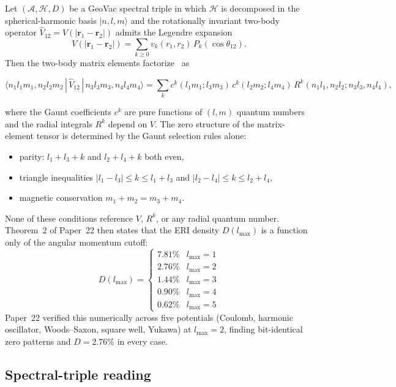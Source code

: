 \documentclass[twocolumn,pra,amsmath,amssymb,superscriptaddress]{revtex4-2}
\begin{document}
Let $(\mathcal{A}, \mathcal{H}, D)$ be a GeoVac spectral triple in
which $\mathcal{H}$ is decomposed in the spherical-harmonic basis
$|n, l, m\rangle$ and the rotationally invariant two-body operator
$\hat{V}_{12} = V(|\mathbf{r}_1 - \mathbf{r}_2|)$ admits the Legendre
expansion
\[
  V(|\mathbf{r}_1 - \mathbf{r}_2|)
  = \sum_{k \ge 0} v_k(r_1, r_2)\, P_k(\cos\theta_{12}).
\]
Then the two-body matrix elements factorize~\cite{paper22} as
\begin{widetext}
\[
  \langle n_1 l_1 m_1, n_2 l_2 m_2\,|\,\hat{V}_{12}\,|
  \,n_3 l_3 m_3, n_4 l_4 m_4 \rangle
  = \sum_k c^k(l_1 m_1; l_3 m_3)\, c^k(l_2 m_2; l_4 m_4)\,
  R^k(n_1 l_1, n_2 l_2; n_3 l_3, n_4 l_4),
\]
\end{widetext}
where the Gaunt coefficients $c^k$ are pure functions of $(l, m)$
quantum numbers and the radial integrals $R^k$ depend on $V$.  The
zero structure of the matrix-element tensor is determined by the
Gaunt selection rules alone:
\begin{itemize}
\item parity: $l_1 + l_3 + k$ and $l_2 + l_4 + k$ both even,
\item triangle inequalities $|l_1 - l_3| \le k \le l_1 + l_3$ and
  $|l_2 - l_4| \le k \le l_2 + l_4$,
\item magnetic conservation $m_1 + m_2 = m_3 + m_4$.
\end{itemize}
None of these conditions reference $V$, $R^k$, or any radial quantum
number.  Theorem~2 of Paper~22 then states that the ERI density
$D(l_{\max})$ is a function only of the angular momentum cutoff:
\begin{equation}
  D(l_{\max}) =
  \begin{cases}
    7.81\% & l_{\max} = 1 \\
    2.76\% & l_{\max} = 2 \\
    1.44\% & l_{\max} = 3 \\
    0.90\% & l_{\max} = 4 \\
    0.62\% & l_{\max} = 5
  \end{cases}
  \label{eq:eri_density}
\end{equation}
Paper~22 verified this numerically across five potentials (Coulomb,
harmonic oscillator, Woods--Saxon, square well, Yukawa) at
$l_{\max} = 2$, finding bit-identical zero patterns and
$D = 2.76\%$ in every case.

\subsection{Spectral-triple reading}
\end{document}
